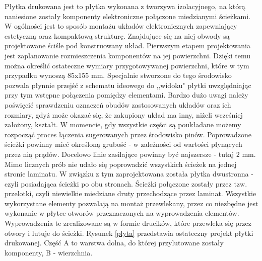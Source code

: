 Płytka drukowana jest to płytka wykonana z tworzywa izolacyjnego, na którą naniesione zostały komponenty elektroniczne połączone miedzianymi ścieżkami. W ogólności jest to sposób montażu układów elektronicznych zapewniający estetyczną oraz kompaktową strukturę. Znajdujące się na niej obwody są projektowane ściśle pod konstruowany układ.
Pierwszym etapem projektowania jest zaplanowanie rozmieszczenia komponentów na jej powierzchni. Dzięki temu można określić ostateczne wymiary przygotowywanej powierzchni, które w tym przypadku wynoszą 85x155 mm. Specjalnie stworzone do tego środowisko pozwala płynnie przejść z schematu ideowego do ,,widoku" płytki uwzględniając przy tym wstępne połączenia pomiędzy elementami. Bardzo dużo uwagi należy poświęcić sprawdzeniu oznaczeń obudów zastosowanych układów oraz ich rozmiary, gdyż może okazać się, że zakupiony układ ma inny, niżeli wcześniej założony, kształt. W momencie, gdy wszystkie części są poukładane możemy rozpocząć proces łączenia sugerowanych przez środowisko pinów. Poprowadzone ścieżki powinny mieć określoną grubość - w zależności od wartości płynących przez nią prądów. Docelowo linie zasilające powinny być najszersze - tutaj 2 mm. Mimo licznych prób nie udało się poprowadzić wszystkich ścieżek na jednej stronie laminatu. W związku z tym zaprojektowana została płytka dwustronna - czyli posiadająca ścieżki po obu stronach. Ścieżki połączone zostały przez tzw. przelotki, czyli niewielkie miedziane druty przechodzące przez laminat. Wszystkie wykorzystane elementy pozwalają na montaż przewlekany, przez co niezbędne jest wykonanie w płytce otworów przeznaczonych na wyprowadzenia elementów. Wyprowadzenia te zrealizowane są w formie drucików, które przewleka się przez otwory i lutuje do ścieżki. Rysunek \ref{plyta} przedstawia ostateczny projekt płytki drukowanej. Część A to warstwa dolna, do której przylutowane zostały komponenty, B - wierzchnia.

